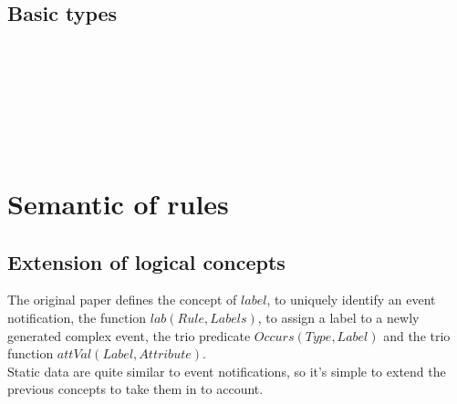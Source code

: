 \subsection{Basic types}
\begin{bnf*}
\\
\\
\\
\\
\\
\\
\end{bnf*}

\newpage

\section{Semantic of rules}

\subsection{Extension of logical concepts}
The original paper defines the concept of $label$, to uniquely identify an event notification, the function $lab(Rule, Labels)$, to assign a label to a newly generated complex event, the trio predicate $Occurs(Type, Label)$ and the trio function $attVal(Label, Attribute)$.\\
Static data are quite similar to event notifications, so it's simple to extend the previous concepts to take them in to account.

